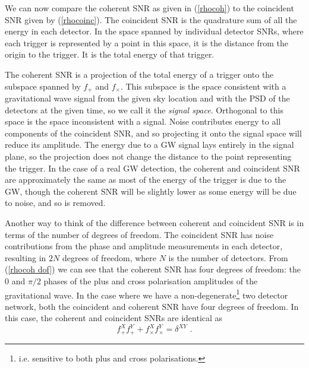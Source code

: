 \documentclass[11pt]{cuthesis}
\newcommand{\fs}{\text{ .}}
\begin{document}
We can now compare the coherent SNR as given in (\ref{rhocoh}) to the coincident SNR given by (\ref{rhocoinc}). The coincident SNR is the quadrature sum of all the energy in each detector. In the space spanned by individual detector SNRs, where each trigger is represented by a point in this space, it is the distance from the origin to the trigger. It is the total energy of that trigger. 

The coherent SNR is a projection of the total energy of a trigger onto the subspace spanned by $f_+$ and $f_\times$. This subspace is the space consistent with a gravitational wave signal from the given sky location and with the PSD of the detectors at the given time, so we call it the \textit{signal space}. Orthogonal to this space is the space inconsistent with a signal. Noise contributes energy to all components of the coincident SNR, and so projecting it onto the signal space will reduce its amplitude. The energy due to a GW signal lays entirely in the signal plane, so the projection does not change the distance to the point representing the trigger. In the case of a real GW detection, the coherent and coincident SNR are approximately the same as most of the energy of the trigger is due to the GW, though the coherent SNR will be slightly lower as some energy will be due to noise, and so is removed. 

Another way to think of the difference between coherent and coincident SNR is in terms of the number of degrees of freedom. The coincident SNR has noise contributions from the phase and amplitude measurements in each detector, resulting in $2N$ degrees of freedom, where $N$ is the number of detectors. From (\ref{rhocoh dof}) we can see that the coherent SNR has four degrees of freedom: the $0$ and $\pi/2$ phases of the plus and cross polarisation amplitudes of the gravitational wave. In the case where we have a non-degenerate\footnote{i.e. sensitive to both plus and cross polarisations.} two detector network, both the coincident and coherent SNR have four degrees of freedom. In this case, the coherent and coincident SNRs are identical as
\begin{equation}
f^X_{+}f^Y_{+}+f^X_{\times}f^Y_{\times}=\delta^{XY} \fs
\end{equation}
\end{document}
